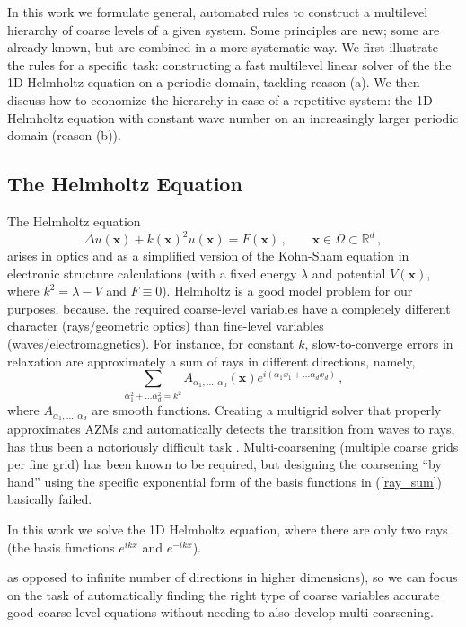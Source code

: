 \documentclass{article}
\newcommand{\bx}{\boldsymbol x}
\newcommand{\R}{\mathbb{R}}
\begin{document}
In this work we formulate general, automated rules to construct a multilevel hierarchy of coarse levels of a given system. Some principles are new; some are already known, but are combined in a more systematic way. We first illustrate the rules for a specific task: constructing a fast multilevel linear solver of the the 1D Helmholtz equation on a periodic domain, tackling reason (a). We then discuss how to economize the hierarchy in case of a repetitive system: the 1D Helmholtz equation with constant wave number on an increasingly larger periodic domain (reason (b)).

\subsection{ The Helmholtz Equation}
The Helmholtz equation 
\begin{equation}
	\Delta u(\bx) + k(\bx)^2 u(\bx) = F(\bx)\,,\qquad \bx \in \Omega \subset \R^d\,,
\end{equation}
arises in optics and as a simplified version of the Kohn-Sham equation in electronic structure calculations (with a fixed energy $\lambda$ and potential $V(\bx)$, where $k^2 = \lambda - V$ and $F \equiv 0$). Helmholtz is a good model problem for our purposes, because. the required coarse-level variables have a completely different character (rays/geometric optics) than fine-level variables (waves/electromagnetics). For instance, for constant $k$, slow-to-converge errors in relaxation are approximately a sum of rays in different directions, namely,
\begin{equation}
    \sum_{\alpha_1^2 + \dots \alpha_d^2 = k^2} A_{\alpha_1,\dots,\alpha_d}(\bx) e^{i (\alpha_1 x_1 + \dots \alpha_d x_d)}\,,
    \label{ray_sum}
\end{equation}
where $A_{\alpha_1,\dots,\alpha_d}$ are smooth functions. Creating a multigrid solver that properly approximates AZMs and automatically detects the transition from waves to rays, has thus been a notoriously difficult task \cite{wave_ray, later_papers}. Multi-coarsening (multiple coarse grids per fine grid) has been known to be required, but designing the coarsening ``by hand'' using the specific exponential form of the basis functions in (\ref{ray_sum}) basically failed.

In this work we solve the 1D Helmholtz equation, where there are only two rays (the basis functions $e^{i k x}$ and $e^{-i k x}$).

as opposed to infinite number of directions in higher dimensions), so we can focus on the task of automatically finding the right type of coarse variables accurate good coarse-level equations without needing to also develop multi-coarsening. 
\end{document}
